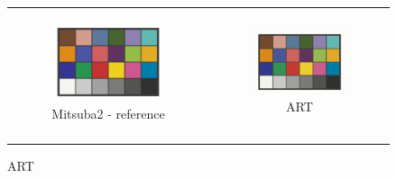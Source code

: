 \renewcommand\thesubfigure{\arabic{subfigure}}
\begin{figure}[h]
	\centering
	\begin{tabular}{cc}
		\begin{subfigure}
			{0.4\textwidth}\centering\includegraphics[width=\linewidth]{img/macbeth_chart_D65.png}
			\caption{Mitsuba2 - reference}
		\end{subfigure}
		&
		\begin{subfigure}
			{0.4\textwidth}\centering\includegraphics[width=\linewidth]{img/macbeth_chart_D65_ART.png}
			\caption{ART}
		\end{subfigure} \\
		\begin{subfigure}

\end{subfigure}
\end{tabular}
\end{figure}
